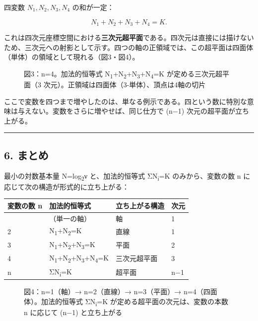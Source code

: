 \documentclass[11pt]{ltjsarticle}
\providecommand{\pandocbounded}[1]{#1}
\newcounter{none}
\begin{document}
四変数 \(N_1, N_2, N_3, N_4\) の和が一定：

\[N_1 + N_2 + N_3 + N_4 = K .\]

これは四次元座標空間における\textbf{三次元超平面}である。四次元は直接には描けないため、三次元への射影として示す。四つの軸の正領域では、この超平面は四面体（単体）の領域として現れる（図3・図4）。

\begin{figure}
\centering
\pandocbounded{}
\caption{図3：n=4。加法的恒等式 N\textsubscript{1}+N\textsubscript{2}+N\textsubscript{3}+N\textsubscript{4}=K が定める三次元超平面（3
次元）。正領域は四面体（3-単体）、頂点は4軸の切片}
\end{figure}

ここで変数を四つまで増やしたのは、単なる例示である。四という数に特別な意味は与えない。変数をさらに増やせば、同じ仕方で
(n−1) 次元の超平面が立ち上がる。

\begin{center}\rule{0.5\linewidth}{0.5pt}\end{center}

\subsection{6. まとめ}\label{ux307eux3068ux3081}

最小の対数基本量 N=log\textsubscript{2}ν と、加法的恒等式 ΣN\textsubscript{i}=K のみから、変数の数 n
に応じて次の構造が形式的に立ち上がる：

{\def\LTcaptype{none} %
\begin{longtable}[]{@{}llll@{}}
\toprule\noalign{}
変数の数 n & 加法的恒等式 & 立ち上がる構造 & 次元 \\
\midrule\noalign{}
\endhead
\bottomrule\noalign{}
\endlastfoot
1 & （単一の軸） & 軸 & 1 \\
2 & N\textsubscript{1}+N\textsubscript{2}=K & 直線 & 1 \\
3 & N\textsubscript{1}+N\textsubscript{2}+N\textsubscript{3}=K & 平面 & 2 \\
4 & N\textsubscript{1}+N\textsubscript{2}+N\textsubscript{3}+N\textsubscript{4}=K & 三次元超平面 & 3 \\
n & ΣN\textsubscript{i}=K & 超平面 & n−1 \\
\end{longtable}
}

\begin{figure}
\centering
\pandocbounded{}
\caption{図4：n=1（軸）→ n=2（直線）→ n=3（平面）→
n=4（四面体）。加法的恒等式 ΣN\textsubscript{i}=K が定める超平面の次元は、変数の本数 n
に応じて (n−1) と立ち上がる}
\end{figure}
\end{document}
